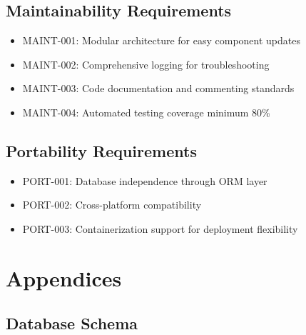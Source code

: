 \documentclass[11pt]{article}
\begin{document}
\subsection{Maintainability Requirements}
\begin{itemize}
    \item MAINT-001: Modular architecture for easy component updates
    \item MAINT-002: Comprehensive logging for troubleshooting
    \item MAINT-003: Code documentation and commenting standards
    \item MAINT-004: Automated testing coverage minimum 80\%
\end{itemize}

\subsection{Portability Requirements}
\begin{itemize}
    \item PORT-001: Database independence through ORM layer
    \item PORT-002: Cross-platform compatibility
    \item PORT-003: Containerization support for deployment flexibility
\end{itemize}

\section{Appendices}

\subsection{Database Schema}
\end{document}
